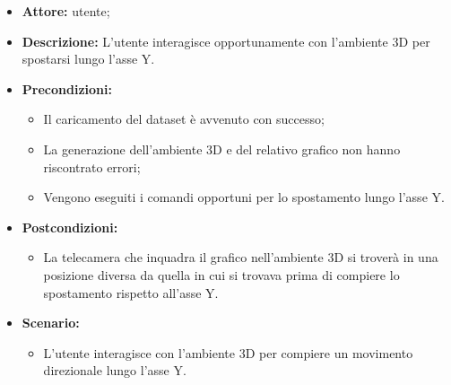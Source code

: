 \begin{itemize}    
    \item \textbf{Attore:} utente;
    \item \textbf{Descrizione:} L'utente interagisce opportunamente con l'ambiente 3D per spostarsi lungo l'asse Y.
    \item \textbf{Precondizioni:}   
        \begin{itemize}
            \item Il caricamento del dataset è avvenuto con successo;
            \item La generazione dell'ambiente 3D e del relativo grafico non hanno riscontrato errori;
            \item Vengono eseguiti i comandi opportuni per lo spostamento lungo l'asse Y.
        \end{itemize}    
    \item \textbf{Postcondizioni:}
        \begin{itemize}
            \item La telecamera che inquadra il grafico nell'ambiente 3D si troverà in una posizione diversa da quella in cui si trovava prima di compiere lo spostamento rispetto all'asse Y.
        \end{itemize}    
    \item \textbf{Scenario:} 
        \begin{itemize}
            \item L'utente interagisce con l'ambiente 3D per compiere un movimento direzionale lungo l'asse Y.
        \end{itemize}
\end{itemize}

